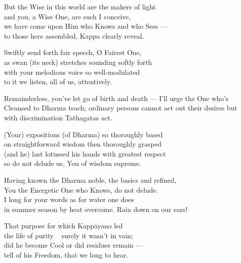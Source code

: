 \begin{MyDescription}{}
But the Wise in this world are the makers of light\\
and you, a Wise One, are such I conceive,\\
we have come upon Him who Knows and who Sees —\\
to those here assembled, Kappa clearly reveal.
\end{MyDescription}

\begin{MyDescription}{}
Swiftly send forth fair speech, O Fairest One,\\
as swan (its neck) stretches sounding softly forth\\
with your melodious voice so well-modulated\\
to it we listen, all of us, attentively.
\end{MyDescription}

\begin{MyDescription}{}
Remainderless, you've let go of birth and death —
I'll urge the One who's Cleansed to Dharma teach;
ordinary persons cannot act out their desires
but with discrimination Tathagatas act.
\end{MyDescription}

\begin{MyDescription}{}
(Your) expositions (of Dharma) so thoroughly based\\
on straightforward wisdom then thoroughly grasped\\
(and he) last lotussed his hands with greatest respect\\
so do not delude us, You of wisdom supreme.
\end{MyDescription}

\begin{MyDescription}{}
Having known the Dharma noble, the basics and refined,\\
You the Energetic One who Knows, do not delude.\\
I long for your words as for water one does\\
in summer season by heat overcome. Rain down on our ears!
\end{MyDescription}

\begin{MyDescription}{}
That purpose for which Kapp\=ayano led\\
the life of purity ~ surely it wasn't in vain;\\
did he become Cool or did residues remain —\\
tell of his Freedom, that we long to hear.
\end{MyDescription}

